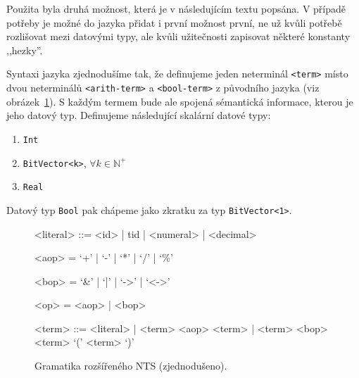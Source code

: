 \documentclass[12pt]{fithesis2}
\begin{document}
Použita byla druhá možnost, která je v následujícím textu popsána. V případě potřeby je možné do jazyka přidat i první možnost první, ne už kvůli potřebě rozlišovat mezi datovými typy, ale kvůli užitečnosti zapisovat některé konstanty ,,hezky''.

Syntaxi jazyka zjednodušíme tak, že definujeme jeden neterminál \texttt{<term>} místo dvou neterminálů \texttt{<arith-term>} a \texttt{<bool-term>} z původního jazyka (viz obrázek~\ref{fig:nts-ext-grammar}). S každým termem bude ale spojená sémantická informace, kterou je jeho datový typ. Definujeme následující skalární datové typy:
\begin{enumerate}
\item \texttt{Int}
\item \texttt{BitVector<k>}, $\forall k \in \mathbb{N^+}$
\item \texttt{Real}
\end{enumerate}
Datový typ \texttt{Bool} pak chápeme jako zkratku za typ \texttt{BitVector<1>}.

\begin{figure}[t]
\begin{grammar}
<literal> ::= <id> | tid | <numeral> | <decimal>

<aop> = `+'  | `-' | `*' | `/' |  `\%'

<bop> = `&' | `|' | `->' | `<->'

<op> = <aop> | <bop>

<term> ::= <literal> | <term> <aop> <term> | <term> <bop> <term> 
\alt `(' <term> `)'
\end{grammar}
\caption{Gramatika rozšířeného NTS (zjednodušeno).}
\label{fig:nts-ext-grammar}
\end{figure}
\end{document}
